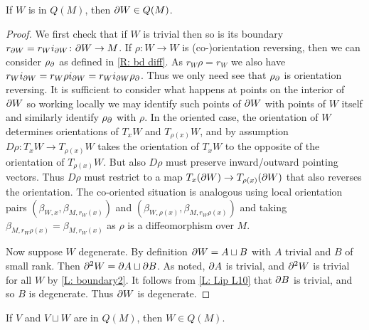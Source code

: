 \begin{lemma}\label{L: bd defined}
If $W$ is in $Q(M)$, then $\partial W \in Q(M)$.
\end{lemma}
\begin{proof}
We first check that if $W$ is trivial then so is its boundary $r_{\partial W} = r_Wi_{\partial W} \colon \partial W \to M$. If $\rho \colon W \to W$ is (co-)orientation reversing, then we can consider $\rho_\partial$ as defined in \cref{R: bd diff}. As $r_W\rho = r_W$ we also have $r_Wi_{\partial W} = r_W\rho i_{\partial W} = r_W i_{\partial W} \rho_\partial$. Thus we only need see that $\rho_\partial$ is orientation reversing. It is sufficient to consider what happens at points on the interior of $\partial W$ so working locally we may identify such points of $\partial W$ with points of $W$ itself and similarly identify $\rho_\partial$ with $\rho$. In the oriented case, the orientation of $W$ determines orientations of $T_xW$ and $T_{\rho(x)}W$, and by assumption $D\rho: T_xW \to T_{\rho(x)}W$ takes the orientation of $T_xW$ to the opposite of the orientation of $T_{\rho(x)}W$. But also $D\rho$ must preserve inward/outward pointing vectors. Thus $D\rho$ must restrict to a map $T_x (\partial W) \to T_{\rho(x)}(\partial W)$ that also reverses the orientation. The co-oriented situation is analogous using local orientation pairs $\left(\beta_{W,x}, \beta_{M,r_W(x)}\right)$ and $\left(\beta_{W,\rho(x)}, \beta_{M,r_W\rho(x)}\right)$ and taking $\beta_{M,r_W\rho(x)} = \beta_{M,r_W(x)}$ as $\rho$ is a diffeomorphism over $M$.



Now suppose $W$ degenerate. By definition $\partial W = A\sqcup B$ with $A$ trivial and $B$ of small rank. Then $\partial^2W = \partial A\sqcup \partial B$. As noted, $\partial A$ is trivial, and $\partial^2 W$ is trivial for all $W$ by \cref{L: boundary2}. It follows from \cref{L: Lip L10} that $\partial B$ is trivial, and so $B$ is degenerate. Thus $\partial W$ is degenerate.
\end{proof}


\begin{lemma}\label{L: Lipy12}
If $V$ and $V\sqcup W$ are in $Q(M)$, then $W \in Q(M)$.
\end{lemma}

